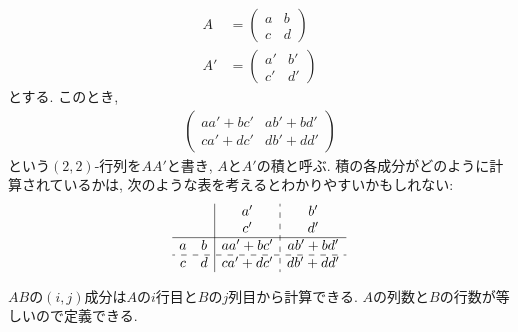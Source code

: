\begin{align*}
  A&=
  \begin{pmatrix}
    a&b\\c&d
  \end{pmatrix}\\
  A'&=
  \begin{pmatrix}
    a'&b'\\c'&d'
  \end{pmatrix}
\end{align*}
とする.
このとき,
\begin{align*}
  \begin{pmatrix}
    aa'+bc'&ab'+bd'\\ca'+dc'&db'+dd'
  \end{pmatrix}
\end{align*}
という$(2,2)$-行列を$AA'$と書き,
$A$と$A'$の積と呼ぶ.
積の各成分がどのように計算されているかは,
次のような表を考えるとわかりやすいかもしれない:
\begin{align*}
  \begin{array}{cc|c:c}
   && a'&b'\\
    && c'&d'\\\hline
    a&b&aa'+bc'&ab'+bd'\\\hdashline
    c&d&ca'+dc'&db'+dd'
  \end{array}
\end{align*}
\begin{remark}
  $AB$の$(i,j)$成分は$A$の$i$行目と$B$の$j$列目から計算できる.
  $A$の列数と$B$の行数が等しいので定義できる.
\end{remark}


